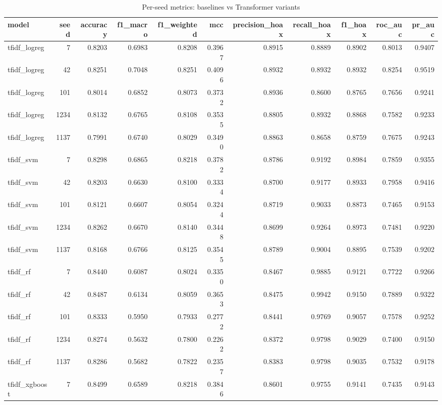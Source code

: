 \begin{table}
\caption{Per-seed metrics: baselines vs Transformer variants}
\label{tab:full_per_seed}
\begin{tabular}{lrrrrrrrrrr}
\toprule
model & seed & accuracy & f1\_macro & f1\_weighted & mcc & precision\_hoax & recall\_hoax & f1\_hoax & roc\_auc & pr\_auc \\
\midrule
tfidf\_logreg & 7 & 0.8203 & 0.6983 & 0.8208 & 0.3967 & 0.8915 & 0.8889 & 0.8902 & 0.8013 & 0.9407 \\
tfidf\_logreg & 42 & 0.8251 & 0.7048 & 0.8251 & 0.4096 & 0.8932 & 0.8932 & 0.8932 & 0.8254 & 0.9519 \\
tfidf\_logreg & 101 & 0.8014 & 0.6852 & 0.8073 & 0.3732 & 0.8936 & 0.8600 & 0.8765 & 0.7656 & 0.9241 \\
tfidf\_logreg & 1234 & 0.8132 & 0.6765 & 0.8108 & 0.3535 & 0.8805 & 0.8932 & 0.8868 & 0.7582 & 0.9233 \\
tfidf\_logreg & 1137 & 0.7991 & 0.6740 & 0.8029 & 0.3490 & 0.8863 & 0.8658 & 0.8759 & 0.7675 & 0.9243 \\
tfidf\_svm & 7 & 0.8298 & 0.6865 & 0.8218 & 0.3782 & 0.8786 & 0.9192 & 0.8984 & 0.7859 & 0.9355 \\
tfidf\_svm & 42 & 0.8203 & 0.6630 & 0.8100 & 0.3334 & 0.8700 & 0.9177 & 0.8933 & 0.7958 & 0.9416 \\
tfidf\_svm & 101 & 0.8121 & 0.6607 & 0.8054 & 0.3244 & 0.8719 & 0.9033 & 0.8873 & 0.7465 & 0.9153 \\
tfidf\_svm & 1234 & 0.8262 & 0.6670 & 0.8140 & 0.3448 & 0.8699 & 0.9264 & 0.8973 & 0.7481 & 0.9220 \\
tfidf\_svm & 1137 & 0.8168 & 0.6766 & 0.8125 & 0.3545 & 0.8789 & 0.9004 & 0.8895 & 0.7539 & 0.9202 \\
tfidf\_rf & 7 & 0.8440 & 0.6087 & 0.8024 & 0.3350 & 0.8467 & 0.9885 & 0.9121 & 0.7722 & 0.9266 \\
tfidf\_rf & 42 & 0.8487 & 0.6134 & 0.8059 & 0.3653 & 0.8475 & 0.9942 & 0.9150 & 0.7889 & 0.9322 \\
tfidf\_rf & 101 & 0.8333 & 0.5950 & 0.7933 & 0.2772 & 0.8441 & 0.9769 & 0.9057 & 0.7578 & 0.9252 \\
tfidf\_rf & 1234 & 0.8274 & 0.5632 & 0.7800 & 0.2262 & 0.8372 & 0.9798 & 0.9029 & 0.7400 & 0.9150 \\
tfidf\_rf & 1137 & 0.8286 & 0.5682 & 0.7822 & 0.2357 & 0.8383 & 0.9798 & 0.9035 & 0.7532 & 0.9178 \\
tfidf\_xgboost & 7 & 0.8499 & 0.6589 & 0.8218 & 0.3846 & 0.8601 & 0.9755 & 0.9141 & 0.7435 & 0.9143 \\

\end{tabular}
\end{table}
